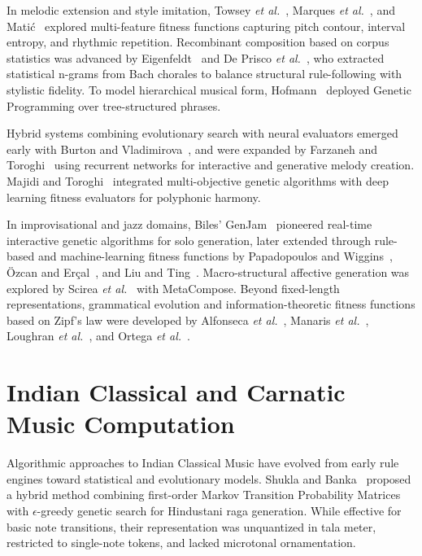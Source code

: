 \documentclass[12pt,a4paper]{report}
\begin{document}
In melodic extension and style imitation, Towsey \textit{et al.}~\cite{towsey2001}, Marques \textit{et al.}~\cite{marques2000}, and Mati{\'c}~\cite{matic2010} explored multi-feature fitness functions capturing pitch contour, interval entropy, and rhythmic repetition. Recombinant composition based on corpus statistics was advanced by Eigenfeldt~\cite{eigenfeldt2012} and De Prisco \textit{et al.}~\cite{deprisco2020}, who extracted statistical n-grams from Bach chorales to balance structural rule-following with stylistic fidelity. To model hierarchical musical form, Hofmann~\cite{hofmann2015} deployed Genetic Programming over tree-structured phrases.

Hybrid systems combining evolutionary search with neural evaluators emerged early with Burton and Vladimirova~\cite{burton1998}, and were expanded by Farzaneh and Toroghi~\cite{farzaneh2019,farzaneh2020} using recurrent networks for interactive and generative melody creation. Majidi and Toroghi~\cite{majidi2022} integrated multi-objective genetic algorithms with deep learning fitness evaluators for polyphonic harmony.

In improvisational and jazz domains, Biles' GenJam~\cite{biles1994,biles2001} pioneered real-time interactive genetic algorithms for solo generation, later extended through rule-based and machine-learning fitness functions by Papadopoulos and Wiggins~\cite{papadopoulos1998}, {\"O}zcan and Er{\c{c}}al~\cite{ozcan2008}, and Liu and Ting~\cite{liuting2019}. Macro-structural affective generation was explored by Scirea \textit{et al.}~\cite{scirea2017} with MetaCompose. Beyond fixed-length representations, grammatical evolution and information-theoretic fitness functions based on Zipf's law were developed by Alfonseca \textit{et al.}~\cite{alfonseca2007}, Manaris \textit{et al.}~\cite{manaris2003}, Loughran \textit{et al.}~\cite{loughran2015}, and Ortega \textit{et al.}~\cite{ortega2008}.

\section{Indian Classical and Carnatic Music Computation}
Algorithmic approaches to Indian Classical Music have evolved from early rule engines toward statistical and evolutionary models. Shukla and Banka~\cite{shukla2023} proposed a hybrid method combining first-order Markov Transition Probability Matrices with $\epsilon$-greedy genetic search for Hindustani raga generation. While effective for basic note transitions, their representation was unquantized in tala meter, restricted to single-note tokens, and lacked microtonal ornamentation.
\end{document}
